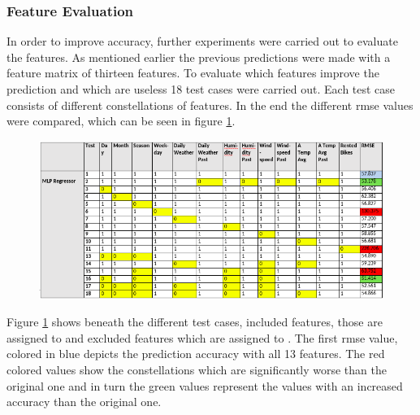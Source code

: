 \subsubsection{Feature Evaluation}\label{sec:featureeval}
In order to improve accuracy, further experiments were carried out to evaluate the features. As mentioned earlier the previous predictions were made with a feature matrix of thirteen features. To evaluate which features improve the prediction and which are useless 18 test cases were carried out. Each test case consists of different constellations of features. In the end the different \acs{rmse} values were compared, which can be seen in figure \ref{fig:evalmlp}.
\begin{figure}[H]
\hspace{-1.5cm}
\includegraphics[width=1.2\textwidth]{img/evalmlp}\label{fig:evalmlp}
\label{fig:evalmlp}
\end{figure}
Figure \ref{fig:evalmlp} shows beneath the different test cases, included features, those are assigned to \grqq
 and excluded features which are assigned to \grqq. The first \acs{rmse} value, colored in blue depicts the prediction accuracy with all 13 features. The red colored values show the constellations which are significantly worse than the original one and in turn the green values represent the values with an increased accuracy than the original one.
